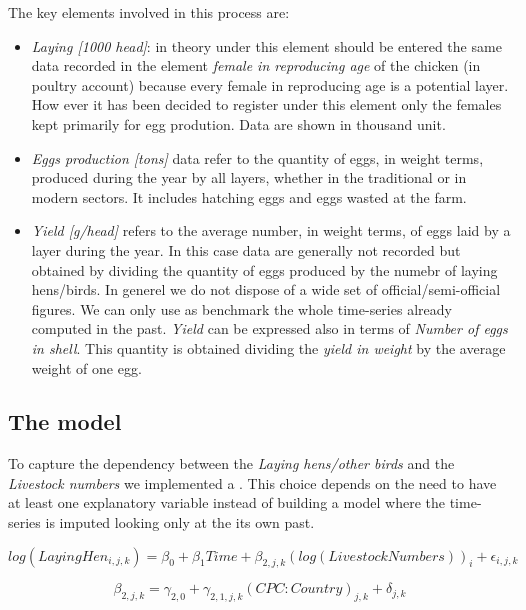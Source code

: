 \documentclass[nojss]{jss}
\begin{document}
The key elements involved in this process are:
\begin{itemize}
\item{\textit{Laying [1000 head]}: in theory under this element should be entered the same data recorded in the element \textit{female in reproducing age} of the chicken (in poultry account) because every female in reproducing age is a potential layer. How ever it has been decided to register under this element only the females kept primarily for egg prodution. Data are shown in thousand unit.}
\item{\textit{Eggs production [tons]} data refer to the quantity of eggs, in weight terms, produced during the year by all layers, whether in the traditional or in modern sectors. It includes hatching eggs and eggs wasted at the farm.}
\item{\textit{Yield [g/head]} refers to the average number, in weight terms, of eggs laid by a layer during the year. In this case data are generally not recorded but obtained by dividing the quantity of eggs produced by the numebr of laying hens/birds. In generel we do not dispose of a wide set of official/semi-official figures. We can only use as benchmark the whole time-series already computed in the past. \textit{Yield} can be expressed also in terms of \textit{Number of eggs in shell}. This quantity is obtained dividing the \textit{yield in weight} by the average weight of one egg.}
\end{itemize}


\subsection{The model}

To capture the dependency between the \textit{Laying hens/other birds} and the \textit{Livestock numbers} we implemented a . This choice depends on the need to have at least one explanatory variable instead of building a model where the time-series is imputed looking only at the its own past.


\begin{dmath*}
log(LayingHen_{i,j,k})= \beta_0 + \beta_{1}Time + \beta_{2,j,k}(log(LivestockNumbers))_{i}+\epsilon_{i,j,k}
\end{dmath*}


\begin{dmath*}
\beta_{2,j,k}= \gamma_{2,0} + \gamma_{2,1,j,k}(CPC:Country)_{j,k}+\delta_{j,k}
\end{dmath*}
\end{document}
